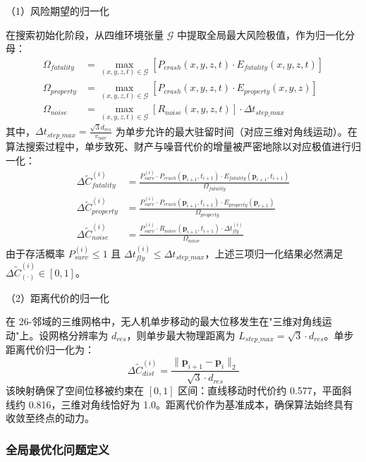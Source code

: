 （1）风险期望的归一化

在搜索初始化阶段，从四维环境张量 $\mathcal{G}$ 中提取全局最大风险极值，作为归一化分母：
\begin{align}
\Omega_{fatality} &= \max_{(x,y,z,t) \in \mathcal{G}} \left[ P_{crash}(x,y,z,t) \cdot E_{fatality}(x,y,z,t) \right] \\
\Omega_{property} &= \max_{(x,y,z,t) \in \mathcal{G}} \left[ P_{crash}(x,y,z,t) \cdot E_{property}(x,y,z) \right] \\
\Omega_{noise} &= \max_{(x,y,z,t) \in \mathcal{G}} \left[ R_{noise}(x,y,z,t) \right] \cdot \Delta t_{step\_max}
\end{align}
其中，$\Delta t_{step\_max} = \frac{\sqrt{3}d_{res}}{v_{uav}}$ 为单步允许的最大驻留时间（对应三维对角线运动）。在算法搜索过程中，单步致死、财产与噪音代价的增量被严密地除以对应极值进行归一化：
\begin{align}
\Delta \tilde{C}_{fatality}^{(i)} &= \frac{P_{surv}^{(i)} \cdot P_{crash}(\mathbf{p}_{i+1}, t_{i+1}) \cdot E_{fatality}(\mathbf{p}_{i+1}, t_{i+1})}{\Omega_{fatality}} \\
\Delta \tilde{C}_{property}^{(i)} &= \frac{P_{surv}^{(i)} \cdot P_{crash}(\mathbf{p}_{i+1}, t_{i+1}) \cdot E_{property}(\mathbf{p}_{i+1})}{\Omega_{property}} \\
\Delta \tilde{C}_{noise}^{(i)} &= \frac{P_{surv}^{(i)} \cdot R_{noise}(\mathbf{p}_{i+1}, t_{i+1}) \cdot \Delta t_{fly}^{(i)}}{\Omega_{noise}}
\end{align}
由于存活概率 $P_{surv}^{(i)} \leq 1$ 且 $\Delta t_{fly}^{(i)} \leq \Delta t_{step\_max}$，上述三项归一化结果必然满足 $\Delta \tilde{C}_{(\cdot)}^{(i)} \in [0,1]$。

（2）距离代价的归一化

在 26-邻域的三维网格中，无人机单步移动的最大位移发生在"三维对角线运动"上。设网格分辨率为 $d_{res}$，则单步最大物理距离为 $L_{step\_max} = \sqrt{3} \cdot d_{res}$。单步距离代价归一化为：
\begin{equation}
\Delta \tilde{C}_{dist}^{(i)} = \frac{\|\mathbf{p}_{i+1} - \mathbf{p}_i\|_2}{\sqrt{3} \cdot d_{res}}
\end{equation}
该映射确保了空间位移被约束在 $[0,1]$ 区间：直线移动时代价约 0.577，平面斜线约 0.816，三维对角线恰好为 1.0。距离代价作为基准成本，确保算法始终具有收敛至终点的动力。

\subsubsection{全局最优化问题定义}

